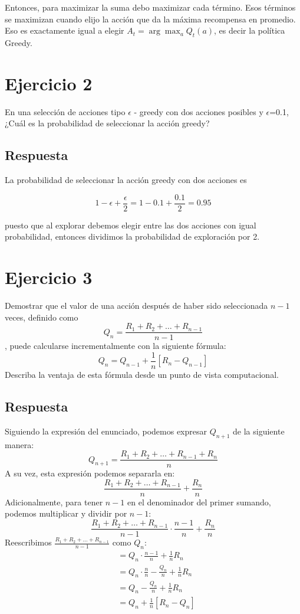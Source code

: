 \documentclass[12pt,a4paper]{article}
\begin{document}
Entonces, para maximizar la suma debo maximizar cada término. Esos términos
se maximizan cuando elijo la acción que da la máxima recompensa en promedio. Eso es
exactamente igual a elegir $ A_t = \arg\max_a Q_t(a) $, es decir la política Greedy.

\section{Ejercicio 2}

En una selección de acciones tipo $\epsilon$ - greedy con dos acciones posibles y $\epsilon$=0.1, ¿Cuál es la probabilidad de seleccionar la acción greedy?

\subsection{Respuesta}

La probabilidad de seleccionar la acción greedy con dos acciones es

$$ 1-\epsilon + \frac{\epsilon}{2}  = 1-0.1 + \frac{0.1}{2} = 0.95$$

puesto que al explorar debemos elegir entre las dos acciones con igual probabilidad, 
entonces dividimos la probabilidad de exploración por 2.

\section{Ejercicio 3}

Demostrar que el valor de una acción después de haber sido seleccionada $n-1$ veces, definido como 
$$Q_n = \frac{R_1 + R_2 + \ldots + R_{n-1}}{n-1}$$
, puede calcularse incrementalmente con la siguiente fórmula:
$$Q_n = Q_{n-1} + \frac{1}{n}[R_n - Q_{n-1}]$$
Describa la ventaja de esta fórmula desde un punto de vista computacional.

\subsection{Respuesta}

Siguiendo la expresión del enunciado, podemos expresar $Q_{n+1}$ de la siguiente manera:
$$Q_{n+1} = \frac{R_1 + R_2 + \ldots + R_{n-1} + R_n}{n}$$
A su vez, esta expresión podemos separarla en:
$$\frac{R_1 + R_2 + \ldots + R_{n-1}}{n} + \frac{R_n}{n}$$
Adicionalmente, para tener $n-1$ en el denominador del primer sumando, podemos multiplicar y dividir por $n-1$:
$$\frac{R_1 + R_2 + \ldots + R_{n-1}}{n-1} \cdot \frac{n-1}{n} + \frac{R_n}{n}$$
Reescribimos $\frac{R_1 + R_2 + \ldots + R_{n-1}}{n-1}$ como $Q_n$:
\begin{align}
\tag{1} &= Q_n \cdot \frac{n-1}{n} + \frac{1}{n}R_n \\
\tag{2} &= Q_n \cdot \frac{n}{n} - \frac{Q_n}{n} + \frac{1}{n}R_n \\
\tag{3} &= Q_n - \frac{Q_n}{n} + \frac{1}{n}R_n \\
\tag{4} &= Q_n + \frac{1}{n}[R_n - Q_n]
\end{align}
\end{document}
